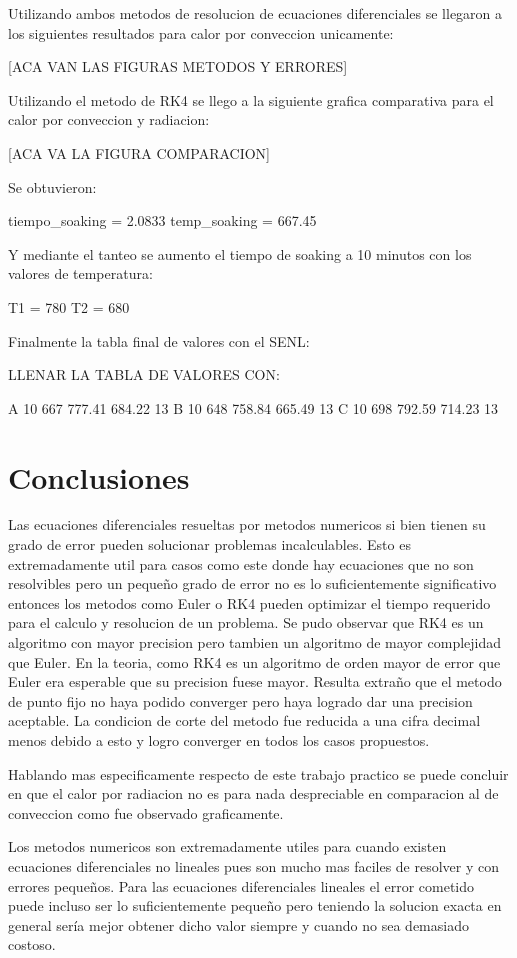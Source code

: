 \documentclass[11pt,a4paper]{article}
\begin{document}
Utilizando ambos metodos de resolucion de ecuaciones diferenciales se llegaron a los siguientes resultados para calor por conveccion unicamente:

[ACA VAN LAS FIGURAS METODOS Y ERRORES]

Utilizando el metodo de RK4 se llego a la siguiente grafica comparativa para el calor por conveccion y radiacion:

[ACA VA LA FIGURA COMPARACION]

Se obtuvieron:

tiempo_soaking =  2.0833
temp_soaking =  667.45

Y mediante el tanteo se aumento el tiempo de soaking a 10 minutos con los valores de temperatura:

T1 = 780
T2 = 680

Finalmente la tabla final de valores con el SENL:

LLENAR LA TABLA DE VALORES CON:

A 10 667 777.41 684.22 13
B 10 648 758.84 665.49 13
C 10 698 792.59 714.23 13

\section{Conclusiones}

Las ecuaciones diferenciales resueltas por metodos numericos si bien tienen su grado de error pueden solucionar problemas incalculables. Esto es extremadamente util para casos como este donde hay ecuaciones que no son resolvibles pero un pequeño grado de error no es lo suficientemente significativo entonces los metodos como Euler o RK4 pueden optimizar el tiempo requerido para el calculo y resolucion de un problema. Se pudo observar que RK4 es un algoritmo con mayor precision pero tambien un algoritmo de mayor complejidad que Euler. En la teoria, como RK4 es un algoritmo de orden mayor de error que Euler era esperable que su precision fuese mayor. Resulta extraño que el metodo de punto fijo no haya podido converger pero haya logrado dar una precision aceptable. La condicion de corte del metodo fue reducida a una cifra decimal menos debido a esto y logro converger en todos los casos propuestos.

Hablando mas especificamente respecto de este trabajo practico se puede concluir en que el calor por radiacion no es para nada despreciable en comparacion al de conveccion como fue observado graficamente.

Los metodos numericos son extremadamente utiles para cuando existen ecuaciones diferenciales no lineales pues son mucho mas faciles de resolver y con errores pequeños. Para las ecuaciones diferenciales lineales el error cometido puede incluso ser lo suficientemente pequeño pero teniendo la solucion exacta en general sería mejor obtener dicho valor siempre y cuando no sea demasiado costoso.
\end{document}
